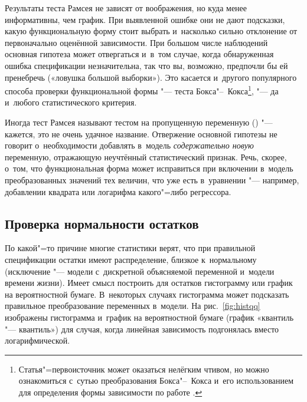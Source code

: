 \documentclass[final,pdftex]{../../template/epsilonj}
\begin{document}
Результаты теста Рамсея не зависят от воображения, но куда менее информативны, чем график. При выявленной ошибке они не дают подсказки, какую функциональную форму стоит выбрать и~насколько сильно отклонение от первоначально оценённой зависимости. При большом числе наблюдений основная гипотеза может отвергаться и~в~том случае, когда обнаруженная ошибка спецификации незначительна, так что вы, возможно, предпочли бы ей пренебречь («ловушка большой выборки»). Это касается и~другого популярного способа проверки функциональной формы "--- теста Бокса"--~Кокса\footnote{Статья"=первоисточник \citep{boxcox64} может оказаться нелёгким чтивом, но можно ознакомиться с~сутью преобразования Бокса"--~Кокса и~его использованием для определения формы зависимости по работе \citet{sakia92}.}\fnnsp, "--- да и~любого статистического критерия.

Иногда тест Рамсея называют тестом на пропущенную переменную () "--- кажется, это не очень удачное название. Отвержение основной гипотезы не говорит о~необходимости добавлять в~модель \textit{содержательно новую} переменную, отражающую неучтённый статистический признак. Речь, скорее, о~том, что функциональная форма может исправиться при включении в~модель преобразованных значений тех величин, что уже есть в~уравнении "--- например, добавлении квадрата или логарифма какого"=либо регрессора.

\subsection{Проверка нормальности остатков}

По какой"=то причине многие статистики верят, что при правильной спецификации остатки имеют распределение, близкое к~нормальному (исключение "--- модели с~дискретной объясняемой переменной и~модели времени жизни). Имеет смысл построить для остатков гистограмму или график на вероятностной бумаге. В~некоторых случаях гистограмма может подсказать правильное преобразование переменных в~модели. На рис.~\ref{fig:histqq} изображены гистограмма и~график на вероятностной бумаге (график «квантиль "--- квантиль») для случая, когда линейная зависимость подгонялась вместо логарифмической.
\end{document}
